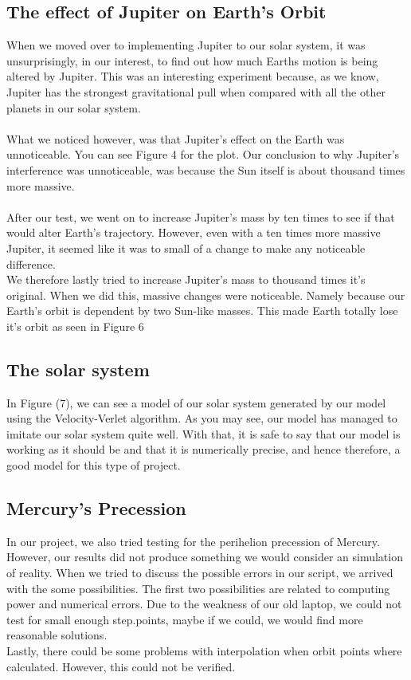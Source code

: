 \documentclass{article}
\begin{document}
\subsection{The effect of Jupiter on Earth's Orbit}

When we moved over to implementing Jupiter to our solar system, it was unsurprisingly, in our interest, to find out how much Earths motion is being altered by Jupiter. This was an interesting experiment because, as we know, Jupiter has the strongest gravitational pull when compared with all the other planets in our solar system. \\
\\
What we noticed however, was that Jupiter's effect on the Earth was unnoticeable. You can see Figure 4 for the plot. Our conclusion to why Jupiter's interference was unnoticeable, was because the Sun itself is about thousand times more massive.\\
\\
After our test, we went on to increase Jupiter's mass by ten times to see if that would alter Earth's trajectory. However, even with a ten times more massive Jupiter, it seemed like it was to small of a change to make any noticeable difference. \\
We therefore lastly tried to increase Jupiter's mass to thousand times it's original. When we did this, massive changes were noticeable. Namely because our Earth's orbit is dependent by two Sun-like masses. This made Earth totally lose it's orbit as seen in Figure 6


\subsection{The solar system}

In Figure (7), we can see a model of our solar system generated by our model using the Velocity-Verlet algorithm. As you may see, our model has managed to imitate our solar system quite well. With that, it is safe to say that our model is working as it should be and that it is numerically precise, and hence therefore, a good model for this type of project. 


\subsection{Mercury's Precession}

In our project, we also tried testing for the perihelion precession of Mercury. However, our results did not produce something we would consider an simulation of reality. When we tried to discuss the possible errors in our script, we arrived with the some possibilities. The first two possibilities are related to computing power and numerical errors. Due to the weakness of our old laptop, we could not test for small enough step.points, maybe if we could, we would find more reasonable solutions. \\
Lastly, there could be some problems with interpolation when orbit points where calculated. However, this could not be verified. 
\end{document}
